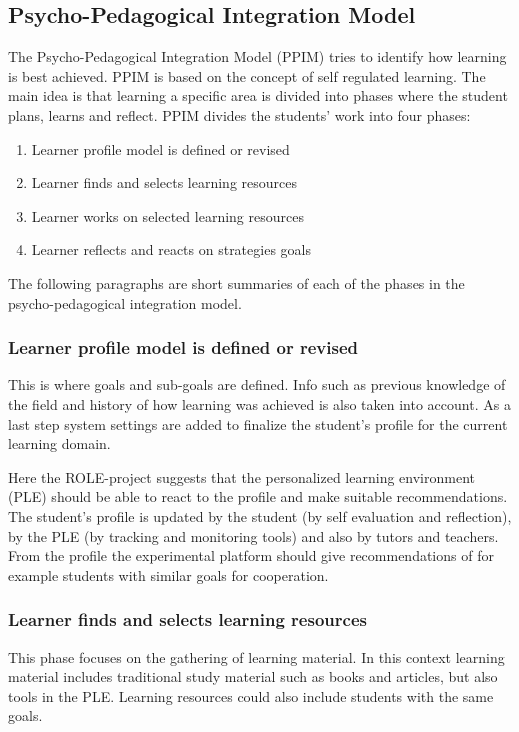 \subsection {Psycho-Pedagogical Integration Model}
The Psycho-Pedagogical Integration Model (PPIM) tries to identify how learning is best achieved. PPIM is based on the concept of self regulated learning. The main idea is that learning a specific area is divided into phases where the student plans, learns and reflect. PPIM divides the students' work into four phases: \cite {nussbaumer}
\begin {enumerate}
	\item Learner profile model is defined or revised
	\item Learner finds and selects learning resources
	\item Learner works on selected learning resources
	\item Learner reflects and reacts on strategies goals
\end {enumerate}

The following paragraphs are short summaries of each of the phases in the psycho-pedagogical integration model.

\subsubsection {Learner profile model is defined or revised}
This is where goals and sub-goals are defined. Info such as previous knowledge of the field and history of how learning was achieved is also taken into account. As a last step system settings are added to finalize the student's profile for the current learning domain.

Here the ROLE-project suggests that the personalized learning environment (PLE) should be able to react to the profile and make suitable recommendations. The student's profile is updated by the student (by self evaluation and reflection), by the PLE (by tracking and monitoring tools) and also by tutors and teachers. From the profile the experimental platform should give recommendations of for example students with similar goals for cooperation.

\subsubsection {Learner finds and selects learning resources}
This phase focuses on the gathering of learning material. In this context learning material includes traditional study material such as books and articles, but also tools in the PLE. Learning resources could also include students with the same goals.

